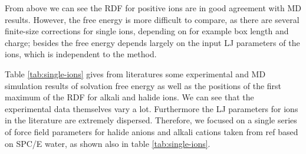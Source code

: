From above we can see the \acs{RDF} for positive ions are in good
agreement with \acs{MD} results. However, the free energy is more
difficult to compare, as there are several finite-size corrections
for single ions, depending on for example box length and charge; besides
the free energy depends largely on the input LJ parameters of the
ions, which is independent to the method.

Table \ref{tab:single-ions} gives from literatures some experimental
and \acs{MD} simulation results of solvation free energy as well
as the positions of the first maximum of the \acs{RDF} for alkali
and halide ions. We can see that the experimental data themselves
vary a lot. Furthermore the LJ parameters for ions in the literature
are extremely dispersed. Therefore, we focused on a single series
of force field parameters for halide anions and alkali cations taken
from ref \citep{horinek_rational_2009} based on SPC/E water, as shown
also in table \ref{tab:single-ions}. 

